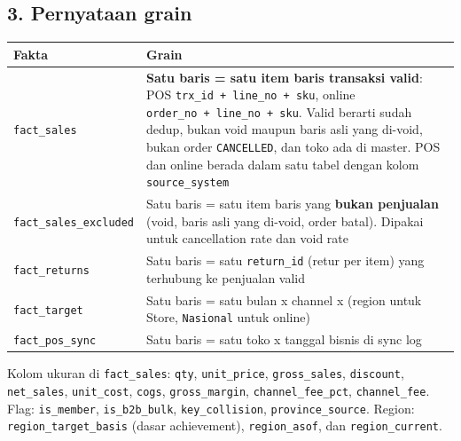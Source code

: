 \documentclass[10pt,a4paper]{article}
\begin{document}
\subsection{3. Pernyataan grain}\label{pernyataan-grain}

{\def\LTcaptype{none} %
\begin{longtable}[]{@{}
  >{\raggedright\arraybackslash}p{}
  >{\raggedright\arraybackslash}p{}@{}}
\toprule\noalign{}
\begin{minipage}[b]{\linewidth}\raggedright
Fakta
\end{minipage} & \begin{minipage}[b]{\linewidth}\raggedright
Grain
\end{minipage} \\
\midrule\noalign{}
\endhead
\bottomrule\noalign{}
\endlastfoot
\texttt{fact\_\allowbreak{}sales} & \textbf{Satu baris = satu item baris transaksi valid}: POS \texttt{trx\_\allowbreak{}id\ +\ line\_\allowbreak{}no\ +\ sku}, online \texttt{order\_\allowbreak{}no\ +\ line\_\allowbreak{}no\ +\ sku}. Valid berarti sudah dedup, bukan void maupun baris asli yang di-void, bukan order \texttt{CANCELLED}, dan toko ada di master. POS dan online berada dalam satu tabel dengan kolom \texttt{source\_\allowbreak{}system} \\
\texttt{fact\_\allowbreak{}sales\_\allowbreak{}excluded} & Satu baris = satu item baris yang \textbf{bukan penjualan} (void, baris asli yang di-void, order batal). Dipakai untuk cancellation rate dan void rate \\
\texttt{fact\_\allowbreak{}returns} & Satu baris = satu \texttt{return\_\allowbreak{}id} (retur per item) yang terhubung ke penjualan valid \\
\texttt{fact\_\allowbreak{}target} & Satu baris = satu bulan x channel x (region untuk Store, \texttt{Nasional} untuk online) \\
\texttt{fact\_\allowbreak{}pos\_\allowbreak{}sync} & Satu baris = satu toko x tanggal bisnis di sync log \\
\end{longtable}
}

Kolom ukuran di \texttt{fact\_\allowbreak{}sales}: \texttt{qty}, \texttt{unit\_\allowbreak{}price}, \texttt{gross\_\allowbreak{}sales}, \texttt{discount}, \texttt{net\_\allowbreak{}sales}, \texttt{unit\_\allowbreak{}cost}, \texttt{cogs},
\texttt{gross\_\allowbreak{}margin}, \texttt{channel\_\allowbreak{}fee\_\allowbreak{}pct}, \texttt{channel\_\allowbreak{}fee}. Flag: \texttt{is\_\allowbreak{}member}, \texttt{is\_\allowbreak{}b2b\_\allowbreak{}bulk}, \texttt{key\_\allowbreak{}collision},
\texttt{province\_\allowbreak{}source}. Region: \texttt{region\_\allowbreak{}target\_\allowbreak{}basis} (dasar achievement), \texttt{region\_\allowbreak{}asof}, dan \texttt{region\_\allowbreak{}current}.
\end{document}
